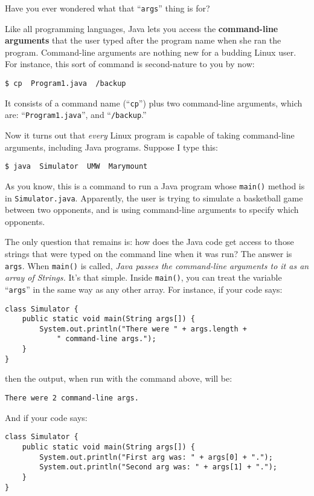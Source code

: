 Have you ever wondered what that ``\texttt{args}'' thing is for?

Like all programming languages, Java lets you access the \textbf{command-line
arguments} that the user typed after the program name when she ran the
program. Command-line arguments are nothing new for a budding Linux user. For
instance, this sort of command is second-nature to you by now:

\medskip
\quad \texttt{\$ cp \ Program1.java \ \freakingtilde/backup }
\medskip

It consists of a command name (``\texttt{cp}'') plus two command-line
arguments, which are: ``\texttt{Program1.java}'', and
``\texttt{\freakingtilde/backup}.''

Now it turns out that \textit{every} Linux program is capable of taking
command-line arguments, including Java programs. Suppose I type this:

\medskip
\quad \texttt{\$ java \ Simulator \ UMW \ Marymount}
\medskip

As you know, this is a command to run a Java program whose \texttt{main()}
method is in \texttt{Simulator.java}. Apparently, the user is trying to
simulate a basketball game between two opponents, and is using command-line
arguments to specify which opponents. 

The only question that remains is: how does the Java code get access to those
strings that were typed on the command line when it was run? The answer is
\texttt{args}. When \texttt{main()} is called, \textit{Java passes the
command-line arguments to it as an array of Strings.} It's that simple. Inside
\texttt{main()}, you can treat the variable ``\texttt{args}'' in the same way
as any other array. For instance, if your code says:

\begin{Verbatim}[fontsize=\footnotesize,samepage=true,frame=single]
class Simulator {
    public static void main(String args[]) {
        System.out.println("There were " + args.length +
            " command-line args.");
    }
}
\end{Verbatim}

then the output, when run with the command above, will be:

\medskip
\quad \texttt{There were 2 command-line args.}
\medskip

And if your code says:

\begin{Verbatim}[fontsize=\footnotesize,samepage=true,frame=single]
class Simulator {
    public static void main(String args[]) {
        System.out.println("First arg was: " + args[0] + ".");
        System.out.println("Second arg was: " + args[1] + ".");
    }
}
\end{Verbatim}

